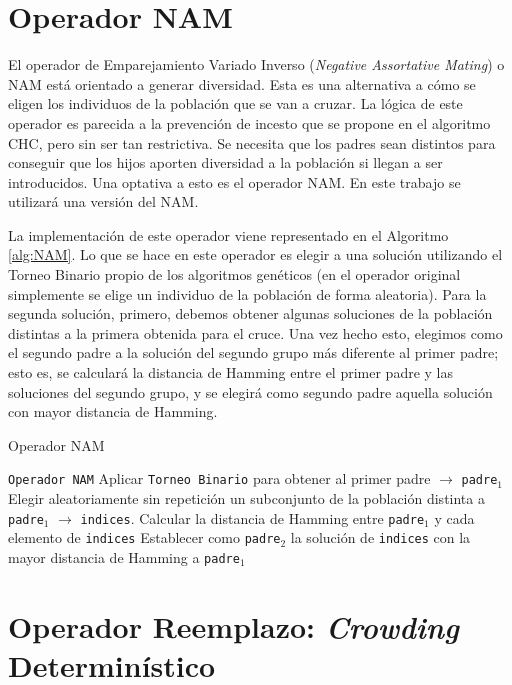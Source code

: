 \section{Operador NAM}

El operador de Emparejamiento Variado Inverso (\textit{Negative Assortative Mating}) o NAM
\parencite{fernandesStudyNonrandomMating2001} está orientado a generar diversidad. 
Esta es una alternativa a cómo se eligen los individuos de la población que se van a cruzar. 
La lógica de este operador es parecida a la prevención de incesto que se propone en el algoritmo CHC, pero sin ser tan restrictiva. 
Se necesita que los padres sean distintos para conseguir que los hijos aporten diversidad a la población si llegan a ser introducidos. 
Una optativa a esto es el operador NAM. 
En este trabajo se utilizará una versión del NAM.

La implementación de este operador viene representado en el Algoritmo \ref{alg:NAM}. 
Lo que se hace en este operador es elegir a una solución utilizando el Torneo Binario propio de los algoritmos genéticos (en el operador original simplemente se elige un individuo de la población de forma aleatoria). 
Para la segunda solución, primero, debemos obtener algunas soluciones de la población distintas a la primera obtenida para el cruce. 
Una vez hecho esto, elegimos como el segundo padre a la solución del segundo grupo más diferente al primer padre; esto es, se calculará la distancia de Hamming entre el primer padre y las soluciones del segundo grupo, y se elegirá como segundo padre aquella solución con mayor distancia de Hamming.

\begin{algorithm}
\caption{Operador NAM}\label{alg:NAM}
\begin{algorithmic}[1]
\Procedure \texttt{Operador NAM}
\State Aplicar \texttt{Torneo Binario} para obtener al primer padre $\xrightarrow{}{}$ \texttt{padre$_1$}
\State Elegir aleatoriamente sin repetición un subconjunto de la población distinta a \texttt{padre$_1$} $\xrightarrow{}{}$ \texttt{indices}.
\State Calcular la distancia de Hamming entre \texttt{padre$_1$} y cada elemento de \texttt{indices}
\State Establecer como \texttt{padre$_2$} la solución de \texttt{indices} con la mayor distancia de Hamming a \texttt{padre$_1$}
\EndProcedure
\end{algorithmic}
\end{algorithm}

\section{Operador Reemplazo: \textit{Crowding} Determinístico}



